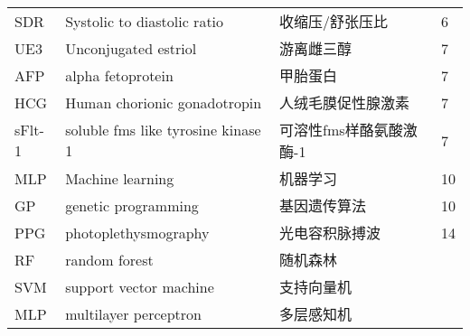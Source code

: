 \begin{center}
\begin{longtable}{m{2cm}m{7cm}m{5cm}m{1cm}<{\centering}}
        SDR     &  Systolic to diastolic ratio & 收缩压/舒张压比 & 6\\
        UE3     & Unconjugated estriol & 游离雌三醇 & 7\\
        AFP     & alpha fetoprotein     & 甲胎蛋白 & 7 \\
        HCG     & Human chorionic gonadotropin  & 人绒毛膜促性腺激素    & 7 \\
        sFlt-1  & soluble fms like tyrosine kinase 1    & 可溶性fms样酪氨酸激酶-1 & 7\\
        MLP     & Machine learning  & 机器学习  & 10    \\
        GP  & genetic programming   & 基因遗传算法  &10 \\
        PPG & photoplethysmography & 光电容积脉搏波 & 14 \\
        
        RF&random forest&随机森林\\
        SVM&support vector machine&支持向量机\\
        MLP&multilayer perceptron&多层感知机\\
	\end{longtable}
\end{center}